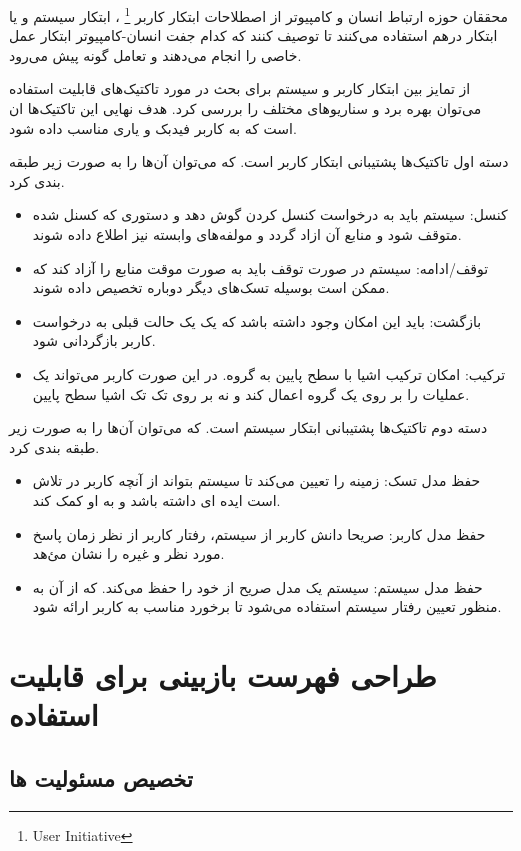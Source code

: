 محققان حوزه ارتباط انسان و کامپیوتر از اصطلاحات ابتکار کاربر \footnote{User Initiative} ، ابتکار سیستم و یا ابتکار درهم استفاده می‌کنند تا توصیف کنند که کدام جفت انسان-کامپیوتر ابتکار عمل خاصی را انجام می‌دهند و تعامل گونه پیش‌ می‌رود.

از تمایز بین ابتکار کاربر و سیستم برای بحث در مورد تاکتیک‌های قابلیت استفاده می‌توان بهره برد و سناریوهای مختلف را بررسی کرد.
هدف نهایی این تاکتیک‌ها ان است که به کاربر فیدبک و یاری مناسب داده شود.

دسته اول تاکتیک‌ها پشتیبانی ابتکار کاربر است. که می‌توان آن‌ها را به صورت زیر طبقه بندی کرد.
\begin{itemize}
\item
کنسل: سیستم باید به درخواست کنسل کردن گوش دهد و دستوری که کسنل شده متوقف شود و منابع آن ازاد گردد و مولفه‌های وابسته نیز اطلاع داده شوند.
\item
توقف/ادامه: سیستم در صورت توقف باید به صورت موقت منابع را آزاد کند که ممکن است بوسیله تسک‌های دیگر دوباره تخصیص داده شوند.
\item
بازگشت: باید این امکان وجود داشته باشد که یک یک حالت قبلی به درخواست کاربر بازگردانی شود.
\item
ترکیب: امکان ترکیب اشیا با سطح پایین به گروه. در این صورت کاربر می‌تواند یک عملیات را بر روی یک گروه اعمال کند و نه بر روی تک تک اشیا سطح پایین.
\end{itemize}

دسته دوم تاکتیک‌ها پشتیبانی ابتکار سیستم است. که می‌توان آن‌ها را به صورت زیر طبقه بندی کرد.
\begin{itemize}
\item
حفظ مدل تسک: زمینه را تعیین می‌کند تا سیستم بتواند از آنچه کاربر در تلاش است ایده ای داشته باشد و به او کمک کند.
\item
حفظ مدل کاربر: صریحا دانش کاربر از سیستم، رفتار کاربر از نظر زمان پاسخ مورد نظر و غیره را نشان می‌ٔهد.
\item
حفظ مدل سیستم: سیستم یک مدل صریح از خود را حفظ می‌کند. که از آن به منظور تعیین رفتار سیستم استفاده می‌شود تا برخورد مناسب به کاربر ارائه شود.
\end{itemize}

\section{طراحی فهرست بازبینی برای قابلیت استفاده}
\subsection{تخصیص مسئولیت ها} 

